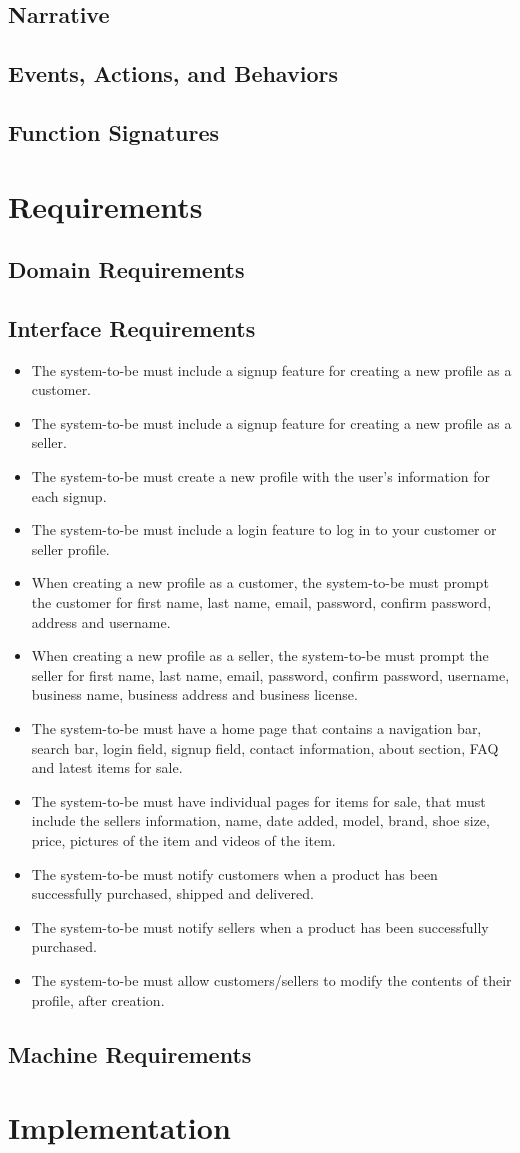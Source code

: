 \subsection{Narrative}
\subsection{Events, Actions, and Behaviors}
\subsection{Function Signatures}
\newpage
\section{Requirements}
\subsection{Domain Requirements}
\subsection{Interface Requirements}
\begin{itemize}
    \item The system-to-be must include a signup feature for creating a new profile as a customer.
    \item The system-to-be must include a signup feature for creating a new profile as a seller.
    \item The system-to-be must create a new profile with the user's information for each signup.
    \item The system-to-be must include a login feature to log in to your customer or seller profile.
    \item When creating a new profile as a customer, the system-to-be must prompt the customer for first name, last name, email, password, confirm password, address and username.
    \item When creating a new profile as a seller, the system-to-be must prompt the seller for first name, last name, email, password, confirm password, username, business name, business address and business license.
    \item The system-to-be must have a home page that contains a navigation bar, search bar, login field, signup field, contact information, about section, FAQ and latest items for sale.
    \item The system-to-be must have individual pages for items for sale, that must include the sellers information, name, date added, model, brand, shoe size, price, pictures of the item and videos of the item.
    \item The system-to-be must notify customers when a product has been successfully purchased, shipped and delivered.
    \item The system-to-be must notify sellers when a product has been successfully purchased.
    \item The system-to-be must allow customers/sellers to modify the contents of their profile, after creation.
\end{itemize}
\subsection{Machine Requirements}
\section{Implementation}
